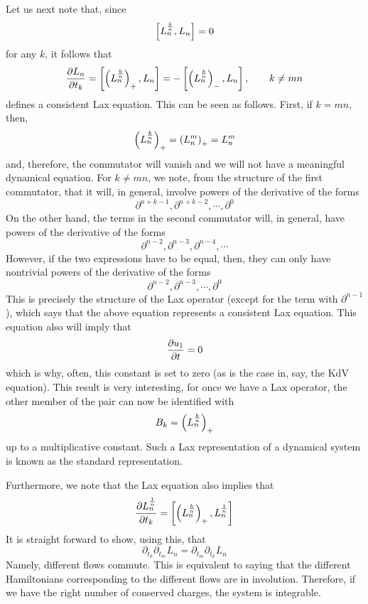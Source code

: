 \documentclass[a4paper,11pt]{article}
\begin{document}
Let us next note that, since
\begin{equation}
\left[ L_{n}^{k\over n} , L_{n} \right] = 0
\end{equation}
for any $k$, it follows that
\begin{equation}
{\partial L_{n}\over \partial t_{k}} = \left[\left(L_{n}^{k\over
n}\right)_{+} , L_{n} \right] = - \left[ \left(L_{n}^{k\over
n}\right)_{-} , L_{n} \right], \qquad k \neq mn
\end{equation} defines a consistent Lax equation. This can be seen as
follows. First, if $k = mn$, then, 
$$
\left(L_{n}^{k\over n}\right)_{+} = \left(L_{n}^{m}\right)_{+} =
L_{n}^{m}
$$ and, therefore, the commutator will vanish and we will not have a
meaningful dynamical equation. For $k\neq mn$, we note, from the
structure of the first commutator, that it will, in general, involve
powers  of the derivative of the forms
$$
\partial^{n+k -1}, \partial^{n+k-2},\cdots , \partial^{0}
$$
On the other hand, the terms in the second commutator will, in
general, have  powers of the derivative of the forms
$$
\partial^{n-2}, \partial^{n-3}, \partial^{n-4},\cdots
$$
However, if the two expressions have to be equal, then, they can only
have nontrivial powers of the derivative of the forms
$$
\partial^{n-2}, \partial^{n-3}, \cdots , \partial^{0}
$$
This is precisely the structure of the Lax operator (except for the
term with $\partial^{n-1}$), which says that the above equation
represents a consistent Lax equation. This equation also will imply
that
$$
{\partial u_{1}\over \partial t} = 0
$$
which is why, often, this constant is set to zero (as is the case in,
say, the KdV equation). This result is very interesting, for once we
have a Lax operator, the other member of the pair can now be
identified with
\begin{equation}
B_{k} = \left(L_{n}^{k\over n}\right)_{+}
\end{equation}
up to a multiplicative constant. Such a Lax representation of a
dynamical system is known as the standard representation.

Furthermore, we note that the Lax equation also implies that
\begin{equation}
{\partial L_{n}^{1\over n}\over \partial t_{k}} = \left[
\left(L_{n}^{k\over n}\right)_{+} , L_{n}^{1\over n} \right]
\end{equation}
It is straight forward to show, using this, that
\begin{equation}
\partial_{t_{k}} \partial_{t_{m}} L_{n} = \partial_{t_{m}}
\partial_{t_{k}} L_{n}
\end{equation}
Namely, different flows commute. This is equivalent to saying that the
different Hamiltonians corresponding to the different flows are in
involution. Therefore, if we have the right number of conserved
charges, the system is integrable.
\end{document}
